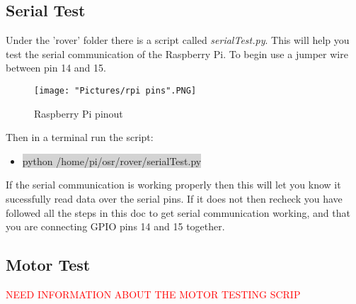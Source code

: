 \documentclass[12pt]{article}
\begin{document}
\subsection{Serial Test}

Under the 'rover' folder there is a script called \textit{serialTest.py}. This will help you test the serial communication of the Raspberry Pi. To begin use a jumper wire between pin 14 and 15. 

\begin{figure}[H]
 	\centering
	\texttt{[image: "Pictures/rpi pins".PNG]}
 	\caption{Raspberry Pi pinout}
	\label{rpi pin}
\end{figure}


Then in a terminal run the script:
\begin{itemize}
	\item[] \colorbox{lightgray}{python /home/pi/osr/rover/serialTest.py}
\end{itemize}

If the serial communication is working properly then this will let you know it sucessfully read data over the serial pins. If it does not then recheck you have followed all the steps in this doc to get serial communication working, and that you are connecting GPIO pins 14 and 15 together. 

\subsection{Motor Test}

\textcolor{red}{NEED INFORMATION ABOUT THE MOTOR TESTING SCRIP}
\end{document}
